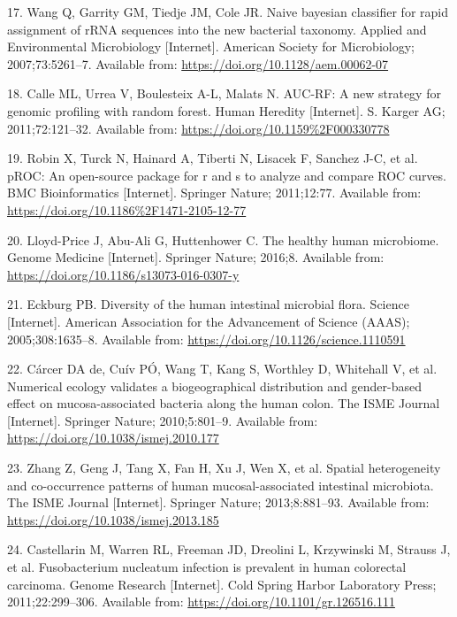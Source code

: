 \documentclass[12pt,]{article}
\begin{document}
\hypertarget{ref-Wang2007}{}
17. Wang Q, Garrity GM, Tiedje JM, Cole JR. Naive bayesian classifier
for rapid assignment of rRNA sequences into the new bacterial taxonomy.
Applied and Environmental Microbiology {[}Internet{]}. American Society
for Microbiology; 2007;73:5261--7. Available from:
\url{https://doi.org/10.1128/aem.00062-07}

\hypertarget{ref-Calle_2011}{}
18. Calle ML, Urrea V, Boulesteix A-L, Malats N. AUC-RF: A new strategy
for genomic profiling with random forest. Human Heredity {[}Internet{]}.
S. Karger AG; 2011;72:121--32. Available from:
\url{https://doi.org/10.1159\%2F000330778}

\hypertarget{ref-Robin_2011}{}
19. Robin X, Turck N, Hainard A, Tiberti N, Lisacek F, Sanchez J-C, et
al. pROC: An open-source package for r and s to analyze and compare ROC
curves. BMC Bioinformatics {[}Internet{]}. Springer Nature; 2011;12:77.
Available from: \url{https://doi.org/10.1186\%2F1471-2105-12-77}

\hypertarget{ref-LloydPrice2016}{}
20. Lloyd-Price J, Abu-Ali G, Huttenhower C. The healthy human
microbiome. Genome Medicine {[}Internet{]}. Springer Nature; 2016;8.
Available from: \url{https://doi.org/10.1186/s13073-016-0307-y}

\hypertarget{ref-Eckburg2005}{}
21. Eckburg PB. Diversity of the human intestinal microbial flora.
Science {[}Internet{]}. American Association for the Advancement of
Science (AAAS); 2005;308:1635--8. Available from:
\url{https://doi.org/10.1126/science.1110591}

\hypertarget{ref-deCarcer2010}{}
22. Cárcer DA de, Cuív PÓ, Wang T, Kang S, Worthley D, Whitehall V, et
al. Numerical ecology validates a biogeographical distribution and
gender-based effect on mucosa-associated bacteria along the human colon.
The ISME Journal {[}Internet{]}. Springer Nature; 2010;5:801--9.
Available from: \url{https://doi.org/10.1038/ismej.2010.177}

\hypertarget{ref-Zhang2013}{}
23. Zhang Z, Geng J, Tang X, Fan H, Xu J, Wen X, et al. Spatial
heterogeneity and co-occurrence patterns of human mucosal-associated
intestinal microbiota. The ISME Journal {[}Internet{]}. Springer Nature;
2013;8:881--93. Available from:
\url{https://doi.org/10.1038/ismej.2013.185}

\hypertarget{ref-Castellarin2011}{}
24. Castellarin M, Warren RL, Freeman JD, Dreolini L, Krzywinski M,
Strauss J, et al. Fusobacterium nucleatum infection is prevalent in
human colorectal carcinoma. Genome Research {[}Internet{]}. Cold Spring
Harbor Laboratory Press; 2011;22:299--306. Available from:
\url{https://doi.org/10.1101/gr.126516.111}
\end{document}
